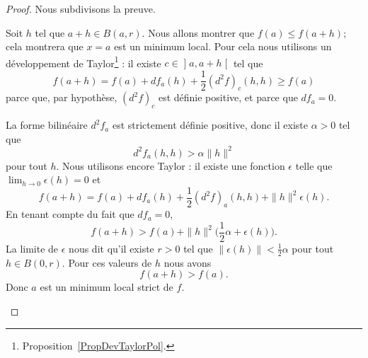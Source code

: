 \begin{proof}
	Nous subdivisons la preuve.

	\begin{subproof}

		\spitem[\ref{ITEMooCBMYooQQMqQL}]

		Soit \( h\) tel que \( a+h\in B(a,r)\). Nous allons montrer que \( f(a)\leq f(a+h)\); cela montrera que \( x=a\) est un minimum local. Pour cela nous utilisons un développement de Taylor\footnote{Proposition~\ref{PropDevTaylorPol}.} : il existe \( c\in \mathopen] a , a+h \mathclose[\) tel que
		\begin{equation}
			f(a+h)=f(a)+df_a(h)+\frac{ 1 }{2}(d^2f)_c(h,h)\geq f(a)
		\end{equation}
		parce que, par hypothèse, \( (d^2f)_c\) est définie positive, et parce que \( df_a=0\).

		\spitem[\ref{ITEMooCVFVooWltGqI}]

		La forme bilinéaire \( d^2f_a\) est strictement définie positive, donc il existe \( \alpha>0\) tel que
		\begin{equation}
			d^2f_a(h,h)>\alpha\| h \|^2
		\end{equation}
		pour tout \( h\). Nous utilisons encore Taylor : il existe une fonction \( \epsilon\) telle que \( \lim_{h\to 0} \epsilon(h)=0\) et
		\begin{equation}
			f(a+h)=f(a)+df_a(h)+\frac{ 1 }{2}(d^2f)_a(h,h)+\| h \|^2\epsilon(h).
		\end{equation}
		En tenant compte du fait que \( df_a=0\),
		\begin{equation}
			f(a+h)>f(a)+\| h \|^2\big( \frac{ 1 }{2}\alpha+ \epsilon(h) \big).
		\end{equation}
		La limite de \( \epsilon\) nous dit qu'il existe \( r>0\) tel que \( \| \epsilon(h) \|<\frac{ 1 }{2}\alpha\) pour tout \( h\in B(0,r)\). Pour ces valeurs de \( h\) nous avons
		\begin{equation}
			f(a+h)>f(a).
		\end{equation}
		Donc \( a\) est un minimum local strict de \( f\).


\end{subproof}
\end{proof}

